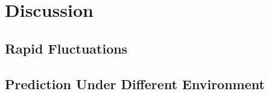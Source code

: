 \section{Discussion}
\subsection{Rapid Fluctuations}
\subsection{Prediction Under Different Environment}